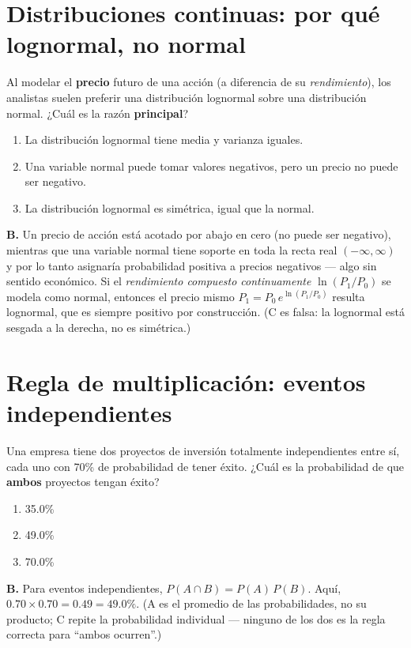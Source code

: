 \documentclass[11pt,a4paper,oneside]{article}
\theoremstyle{definition}
\begin{document}
\section{Distribuciones continuas: por qué lognormal, no normal}

\begin{cfaBox}
Al modelar el \textbf{precio} futuro de una acción (a diferencia de su
\emph{rendimiento}), los analistas suelen preferir una distribución
lognormal sobre una distribución normal. ¿Cuál es la razón
\textbf{principal}?
\begin{enumerate}[label=\Alph*.]
\item La distribución lognormal tiene media y varianza iguales.
\item Una variable normal puede tomar valores negativos, pero un precio no puede ser negativo.
\item La distribución lognormal es simétrica, igual que la normal.
\end{enumerate}
\end{cfaBox}
\begin{solBox}
\textbf{B.} Un precio de acción está acotado por abajo en cero (no puede
ser negativo), mientras que una variable normal tiene soporte en toda la
recta real $(-\infty,\infty)$ y por lo tanto asignaría probabilidad
positiva a precios negativos --- algo sin sentido económico. Si el
\emph{rendimiento compuesto continuamente} $\ln(P_1/P_0)$ se modela como
normal, entonces el precio mismo $P_1=P_0\,e^{\ln(P_1/P_0)}$ resulta
lognormal, que es siempre positivo por construcción. (C es falsa: la
lognormal está sesgada a la derecha, no es simétrica.)
\end{solBox}

\section{Regla de multiplicación: eventos independientes}

\begin{cfaBox}
Una empresa tiene dos proyectos de inversión totalmente independientes
entre sí, cada uno con 70\% de probabilidad de tener éxito. ¿Cuál es la
probabilidad de que \textbf{ambos} proyectos tengan éxito?
\begin{enumerate}[label=\Alph*.]
\item 35.0\%
\item 49.0\%
\item 70.0\%
\end{enumerate}
\end{cfaBox}
\begin{solBox}
\textbf{B.} Para eventos independientes, $P(A\cap B)=P(A)\,P(B)$. Aquí,
$0.70\times0.70=0.49=49.0\%$. (A es el promedio de las probabilidades, no
su producto; C repite la probabilidad individual --- ninguno de los dos es
la regla correcta para ``ambos ocurren''.)
\end{solBox}
\end{document}
